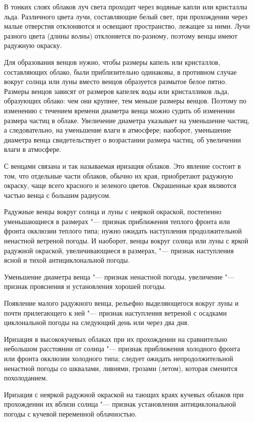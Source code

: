 В тонких слоях облаков луч света проходит через водяные капли или
кристаллы льда. Различного цвета лучи, составляющие белый свет, при
прохождении через малые отверстия отклоняются и освещают пространство,
лежащее за ними. Лучи разного цвета (длины волны) отклоняется
по-разному, поэтому венцы имеют радужную окраску.

Для образования венцов нужно, чтобы размеры капель или кристаллов,
составляющих облако, были приблизительно одинаковы, в противном случае
вокруг солнца или луны вместо венцов образуется размытое белое
пятно. Размеры венцов зависят от размеров капелек воды или
кристалликов льда, образующих облако: чем они крупнее, тем меньше
размеры венцов. Поэтому по изменению с течением времени диаметра венца
можно судить об изменении размера частиц в облаке. Увеличение диаметра
указывает на уменьшение частиц, а следовательно, на уменьшение влаги в
атмосфере; наоборот, уменьшение диаметра венца свидетельствует о
возрастании размера частиц, об увеличении влаги в атмосфере.

С венцами связана и так называемая иризация облаков. Это явление
состоит в том, что отдельные части облаков, обычно их края,
приобретают радужную окраску, чаще всего красного и зеленого
цветов. Окрашенные края являются частью венца с большим радиусом.

 Радужные венцы вокруг солнца и луны с неяркой окраской,
постепенно уменьшающиеся в размерах "--- признак приближения теплого
фронта или фронта окклюзии теплого типа; нужно ожидать наступления
продолжительной ненастной ветреной погоды. И наоборот, венцы вокруг
солнца или луны с яркой радужной окраской, увеличивающиеся в размерах,
"--- признак наступления ясной и тихой антициклональной погоды.

 Уменьшение диаметра венца "--- признак ненастной погоды,
увеличение "--- признак прояснения и установления хорошей погоды.

 Появление малого радужного венца, рельефно выделяющегося вокруг
луны и почти прилегающего к ней "--- признак наступления ветреной с
осадками циклональной погоды на следующий день или через два дня.

 Иризация в высококучевых облаках при их прохождении на
сравнительно небольшом расстоянии от солнца "--- признак приближения
холодного фронта или фронта окклюзии холодного типа; следует ожидать
непродолжительной ненастной погоды со шквалами, ливнями, грозами
(летом), которая сменится похолоданием.

 Иризация с неяркой радужной окраской на тающих краях кучевых
облаков при прохождении их вблизи солнца "--- признак установления
антициклональной погоды с кучевой переменной облачностью.

